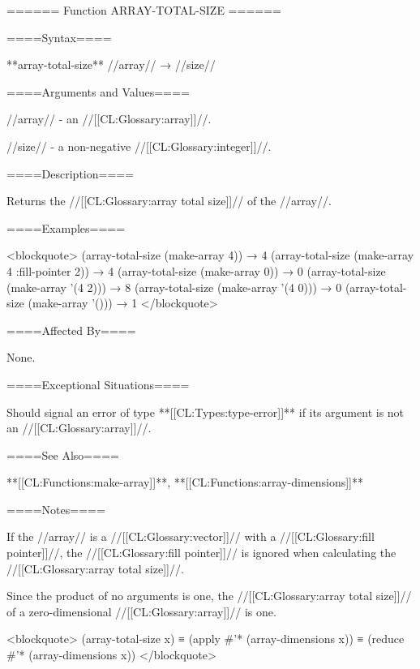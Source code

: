 ====== Function ARRAY-TOTAL-SIZE ======

====Syntax====

**array-total-size** //array// → //size//

====Arguments and Values====

//array// - an //[[CL:Glossary:array]]//.

//size// - a non-negative //[[CL:Glossary:integer]]//.

====Description====

Returns the //[[CL:Glossary:array total size]]// of the //array//.

====Examples====

<blockquote> (array-total-size (make-array 4)) → 4 (array-total-size (make-array 4 :fill-pointer 2)) → 4 (array-total-size (make-array 0)) → 0 (array-total-size (make-array '(4 2))) → 8 (array-total-size (make-array '(4 0))) → 0 (array-total-size (make-array '())) → 1 </blockquote>

====Affected By====

None.

====Exceptional Situations====

Should signal an error of type **[[CL:Types:type-error]]** if its argument is not an //[[CL:Glossary:array]]//.

====See Also====

**[[CL:Functions:make-array]]**, **[[CL:Functions:array-dimensions]]**

====Notes====

If the //array// is a //[[CL:Glossary:vector]]// with a //[[CL:Glossary:fill pointer]]//, the //[[CL:Glossary:fill pointer]]// is ignored when calculating the //[[CL:Glossary:array total size]]//.

Since the product of no arguments is one, the //[[CL:Glossary:array total size]]// of a zero-dimensional //[[CL:Glossary:array]]// is one.

<blockquote> (array-total-size x) ≡ (apply #'* (array-dimensions x)) ≡ (reduce #'* (array-dimensions x)) </blockquote>

